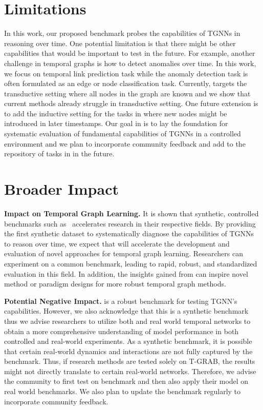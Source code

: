 \section{Limitations} \label{appendix:limit}

In this work, our proposed \benchmarkname benchmark probes the capabilities of TGNNs in reasoning over time. One potential limitation is that there might be other capabilities that would be important to test in the future. For example, another challenge in temporal graphs is how to detect anomalies over time. In this work, we focus on temporal link prediction task while the anomaly detection task is often formulated as an edge or node classification task. Currently, \benchmarkname targets the transductive setting where all nodes in the graph are known and we show that current methods already struggle in transductive setting. One future extension is to add the inductive setting for the tasks in \benchmarkname where new nodes might be introduced in later timestamps. Our goal in \benchmarkname is to lay the foundation for systematic evaluation of fundamental capabilities of TGNNs in a controlled environment and we plan to incorporate community feedback and add to the repository of tasks in \benchmarkname in the future.



\section{Broader Impact} \label{appendix:impact}

\textbf{Impact on Temporal Graph Learning.}
It is shown that synthetic, controlled benchmarks such as~\citep{clevr,babi,bsuite} accelerates research in their respective fields. By providing the first synthetic dataset to systematically diagnose the capabilities of TGNNs to reason over time, we expect that \benchmarkname will accelerate the development and evaluation of novel approaches for temporal graph learning. Researchers can experiment on a common benchmark, leading to rapid, robust, and standardized evaluation in this field. In addition, the insights gained from \benchmarkname can inspire novel method or paradigm designs for more robust temporal graph methods. 

\textbf{Potential Negative Impact.} 
\benchmarkname is a robust benchmark for testing TGNN's capabilities. However, we also acknowledge that this is a synthetic benchmark thus we advise researchers to utilize both \benchmarkname and real world temporal networks to obtain a more comprehensive understanding of model performance in both controlled and real-world experiments. As a synthetic benchmark, it is possible that certain real-world dynamics and interactions are not fully captured by the benchmark. Thus, if research methods are tested solely on T-GRAB, the results might not directly translate to certain real-world networks. Therefore, we advise the community to first test on \benchmarkname benchmark and then also apply their model on real world benchmarks. We also plan to update the benchmark regularly to incorporate community feedback. 


